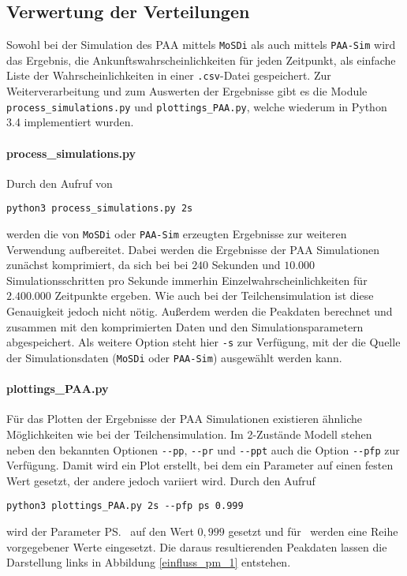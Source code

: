 \subsection{Verwertung der Verteilungen}
Sowohl bei der Simulation des PAA mittels \texttt{MoSDi} als auch mittels \texttt{PAA-Sim} wird das Ergebnis, die Ankunftswahrscheinlichkeiten für jeden Zeitpunkt, als einfache Liste der Wahrscheinlichkeiten in einer \texttt{.csv}-Datei gespeichert. Zur Weiterverarbeitung und zum Auswerten der Ergebnisse gibt es die Module \verb!process_simulations.py! und \verb!plottings_PAA.py!, welche wiederum in Python 3.4 implementiert wurden.

\paragraph{process\_simulations.py}
Durch den Aufruf von 
\begin{verbatim}
python3 process_simulations.py 2s  
\end{verbatim}
werden die von \texttt{MoSDi} oder \texttt{PAA-Sim} erzeugten Ergebnisse zur weiteren Verwendung aufbereitet. Dabei werden die Ergebnisse der PAA Simulationen zunächst komprimiert, da sich bei bei $240$ Sekunden und $10.000$ Simulationsschritten pro Sekunde immerhin Einzelwahrscheinlichkeiten für $2.400.000$ Zeitpunkte ergeben. Wie auch bei der Teilchensimulation ist diese Genauigkeit jedoch nicht nötig. 
Außerdem werden die Peakdaten berechnet und zusammen mit den komprimierten Daten und den Simulationsparametern abgespeichert.
Als weitere Option steht hier \verb!-s! zur Verfügung, mit der die Quelle der Simulationsdaten (\texttt{MoSDi} oder \texttt{PAA-Sim}) ausgewählt werden kann.

\paragraph{plottings\_PAA.py}
Für das Plotten der Ergebnisse der PAA Simulationen existieren ähnliche Möglichkeiten wie bei der Teilchensimulation.
Im 2-Zustände Modell stehen neben den bekannten Optionen \verb!--pp!, \verb!--pr! und \verb!--ppt! auch die Option \verb!--pfp! zur Verfügung. Damit wird ein Plot erstellt, bei dem ein Parameter auf einen festen Wert gesetzt, der andere jedoch variiert wird. Durch den Aufruf
\begin{verbatim}
python3 plottings_PAA.py 2s --pfp ps 0.999
\end{verbatim}
wird der Parameter \ps\ auf den Wert $0,999$ gesetzt und für \pm\ werden eine Reihe vorgegebener Werte eingesetzt. Die daraus resultierenden Peakdaten lassen die Darstellung links in Abbildung \ref{einfluss_pm_1} entstehen.

